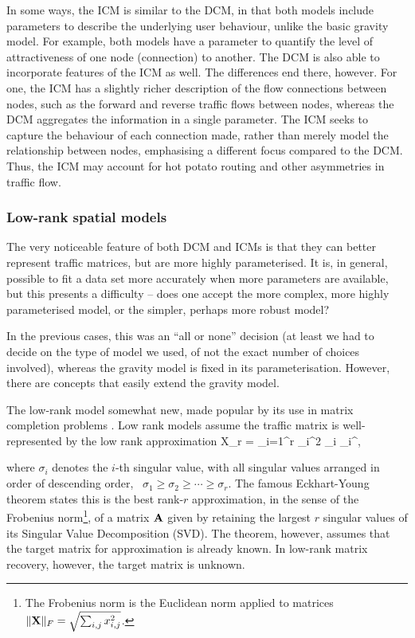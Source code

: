 In some ways, the ICM is similar to the DCM, in that both models include parameters to describe the
underlying user behaviour, unlike the basic gravity model. For example, both models have a parameter to quantify the level of
attractiveness of one node (connection) to another. The DCM is also able to incorporate features of the ICM as well. The differences end there, however. For one, the ICM has a slightly richer description of the flow connections between nodes, such as the forward and reverse traffic flows
between nodes, whereas the DCM aggregates the information in a single parameter. The ICM seeks 
to capture the behaviour of each connection made, rather than merely model the relationship between nodes, emphasising a 
different focus compared to the DCM. Thus, the ICM may account for hot potato routing and other
asymmetries in traffic flow.

\subsubsection{Low-rank spatial models}

The very noticeable feature of both DCM and ICMs is that they can
better represent traffic matrices, but are more highly
parameterised. It is, in general, possible to fit a data set more
accurately when more parameters are available, but this presents a
difficulty -- does one accept the more complex, more highly
parameterised model, or the simpler, perhaps more robust model?

In the previous cases, this was an ``all or none'' decision (at least
we had to decide on the type of model we used, of not the exact number
of choices involved), whereas the gravity model is fixed in its
parameterisation. However, there are concepts that easily extend the
gravity model. 

The low-rank model somewhat new, made popular by its use in matrix
completion problems \cite
{CandesPlan09MtxNoise,CandesRecht08MtxComp,CandesTao09MtxComp,Recht07MtxComp}. Low
rank models assume the traffic matrix is well-represented by the low
rank approximation 
\be X_r = \sum_{i=1}^r \sigma_i^2 \bu_i \bv_i^\T,
\label{eq:low_rank1}
\ee

\noindent where $\sigma_i$ denotes the $i$-th singular value, with all
singular values arranged in order of descending order, \ie~$\sigma_1
\ge \sigma_2 \ge \cdots \ge\sigma_r$. The famous Eckhart-Young theorem
\cite[Theorem 4.32, p.~70]{Stewart98MtxVol1} states this is the best
rank-$r$ approximation, in the sense of the Frobenius norm\footnote{The 
Frobenius norm is the Euclidean norm applied to matrices \ie~
$\|\mathbf{X}\|_F = \sqrt{\sum_{i,j} x^2_{i,j}}$.}, of a
matrix $\mathbf{A}$ given by retaining the largest $r$ singular values of
its Singular Value Decomposition (SVD). The theorem, however, assumes
that the target matrix for approximation is already known. In low-rank
matrix recovery, however, the target matrix is unknown.

